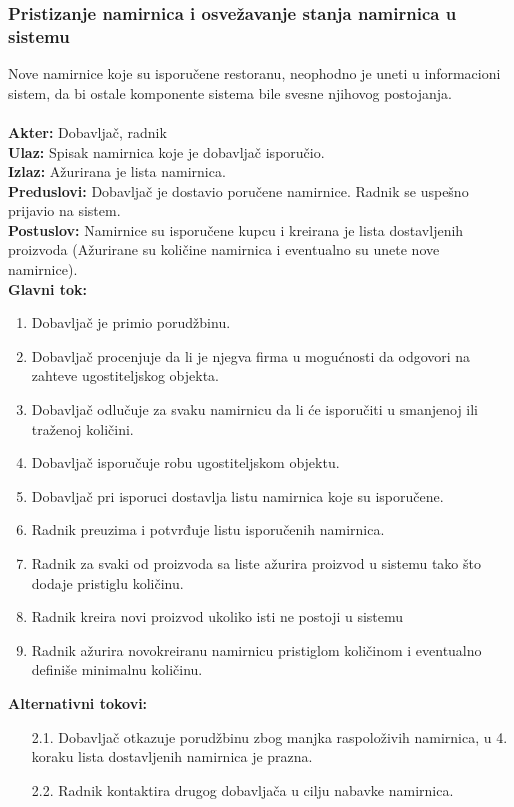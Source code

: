 \documentclass{article}
\begin{document}
\subsubsection{Pristizanje namirnica i osvežavanje stanja namirnica u sistemu}
Nove namirnice koje su isporučene restoranu, neophodno je uneti u informacioni sistem, da bi ostale komponente sistema bile svesne njihovog postojanja.\\\\
\textbf{Akter:} Dobavljač, radnik\\
\textbf{Ulaz:} Spisak namirnica koje je dobavljač isporučio.\\
\textbf{Izlaz:} Ažurirana je lista namirnica.\\
\textbf{Preduslovi:} Dobavljač je dostavio poručene namirnice. Radnik se uspešno prijavio na sistem. \\
\textbf{Postuslov:} Namirnice su isporučene kupcu i kreirana je lista dostavljenih proizvoda (Ažurirane su količine namirnica i eventualno su unete nove namirnice).\\
\textbf{Glavni tok:} 
\begin{enumerate}
	\item Dobavljač je primio porudžbinu.
	\item Dobavljač procenjuje da li je njegva firma u mogućnosti da odgovori na zahteve ugostiteljskog objekta.
	\item Dobavljač odlučuje za svaku namirnicu da li će isporučiti u smanjenoj ili traženoj količini.
	\item Dobavljač isporučuje robu ugostiteljskom objektu.
	\item Dobavljač pri isporuci dostavlja listu namirnica koje su isporučene.
    \item Radnik preuzima i potvrđuje listu isporučenih namirnica.
	\item Radnik za svaki od proizvoda sa liste ažurira proizvod u sistemu tako što dodaje pristiglu količinu.
	\item Radnik kreira novi proizvod ukoliko isti ne postoji u sistemu
	\item Radnik ažurira novokreiranu namirnicu pristiglom količinom i eventualno definiše minimalnu količinu. 
\end{enumerate}
\textbf{Alternativni tokovi:} 
\begin{itemize}
\item[2.1.] Dobavljač otkazuje porudžbinu zbog manjka raspoloživih namirnica, u 4. koraku lista dostavljenih namirnica je prazna.
\item[2.2.] Radnik kontaktira drugog dobavljača u cilju nabavke namirnica.
\end{itemize}
\end{document}
